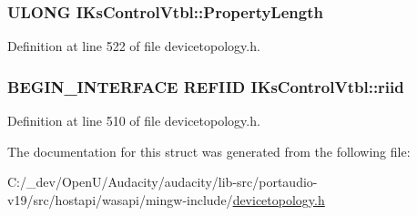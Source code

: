 \subsubsection[{\texorpdfstring{Property\+Length}{PropertyLength}}]{ {\bf U\+L\+O\+NG} I\+Ks\+Control\+Vtbl\+::\+Property\+Length}\hypertarget{struct_i_ks_control_vtbl_ac663f8f3c61a364070f0c0fab00efa9f}{}\label{struct_i_ks_control_vtbl_ac663f8f3c61a364070f0c0fab00efa9f}


Definition at line 522 of file devicetopology.\+h.

\subsubsection[{\texorpdfstring{riid}{riid}}]{\setlength{\rightskip}{0pt plus 5cm}B\+E\+G\+I\+N\+\_\+\+I\+N\+T\+E\+R\+F\+A\+CE {\bf R\+E\+F\+I\+ID} I\+Ks\+Control\+Vtbl\+::riid}\hypertarget{struct_i_ks_control_vtbl_aeda49340b0d46e0d76c6dd3762fe75ba}{}\label{struct_i_ks_control_vtbl_aeda49340b0d46e0d76c6dd3762fe75ba}


Definition at line 510 of file devicetopology.\+h.



The documentation for this struct was generated from the following file\+:\begin{DoxyCompactItemize}
\item 
C\+:/\+\_\+dev/\+Open\+U/\+Audacity/audacity/lib-\/src/portaudio-\/v19/src/hostapi/wasapi/mingw-\/include/\hyperlink{devicetopology_8h}{devicetopology.\+h}\end{DoxyCompactItemize}
